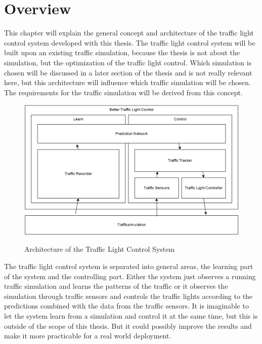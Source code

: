 \section{Overview}

This chapter will explain the general concept and architecture of the traffic light control system developed with this thesis. The traffic light control system will be built upon an existing traffic simulation, because the thesis is not about the simulation, but the optimization of the traffic light control. Which simulation is chosen will be discussed in a later section of the thesis and is not really relevant here, but this architecture will influence which traffic simulation will be chosen. The requirements for the traffic simulation will be derived from this concept.

\begin{figure}[ht]
  \centering
  \includegraphics[width=16cm]{figures/architecture}
  \label{architecture}
  \caption[Architecture of the Traffic Light Control System]{Architecture of the Traffic Light Control System \protect\footnotemark}
\end{figure}


The traffic light control system is separated into general areas, the learning part of the system and the controlling part. Either the system just observes a running traffic simulation and learns the patterns of the traffic or it observes the simulation through traffic sensors and controls the traffic lights according to the predictions combined with the data from the traffic sensors. It is imaginable to let the system learn from a simulation and control it at the same time, but this is outside of the scope of this thesis. But it could possibly improve the results and make it more practicable for a real world deployment.


